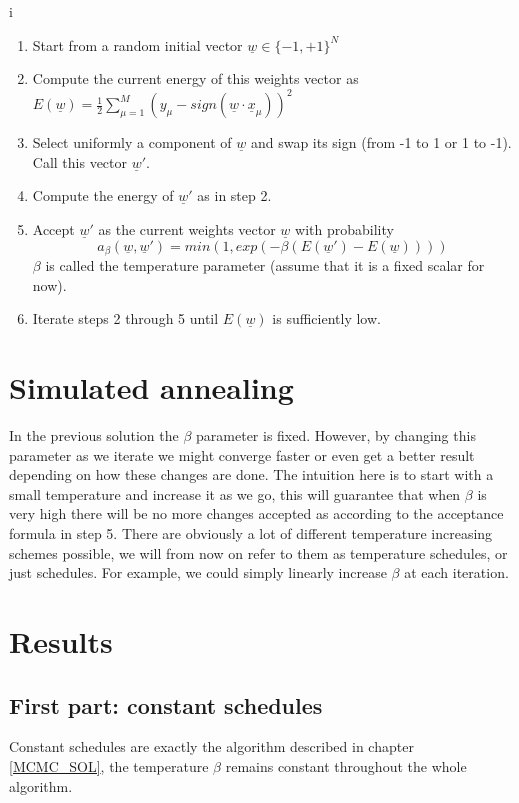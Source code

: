 i\documentclass[a4paper]{article}
\begin{document}
\begin{enumerate}
\item Start from a random initial vector $\underline{w} \in \{-1, +1\}^{N}$
\item Compute the current energy of this weights vector as $E(\underline{w}) = \frac{1}{2} \sum_{\mu = 1}^{M} (y_{\mu} - sign(\underline{w} \cdot \underline{x}_{\mu}))^2$
\item Select uniformly a component of $\underline{w}$ and swap its sign (from -1 to 1 or 1 to -1). Call this vector $\underline{w}'$.
\item Compute the energy of $\underline{w}'$ as in step 2. 
\item Accept $\underline{w}'$ as the current weights vector  $\underline{w}$ with probability \[a_{\beta}(\underline{w}, \underline{w}') = min(1, exp(-\beta(E(\underline{w}') - E(\underline{w}))))\] $\beta$ is called the temperature parameter (assume that it is a fixed scalar for now).
\item Iterate steps 2 through 5 until $E(\underline{w})$ is sufficiently low.
\end{enumerate}

\section{Simulated annealing}

In the previous solution the $\beta$ parameter is fixed. However, by changing this parameter as we iterate we might converge faster or even get a better result depending on how these changes are done. The intuition here is to start with a small temperature and increase it as we go, this will guarantee that when $\beta$ is very high there will be no more changes accepted as according to the acceptance formula in step 5.
There are obviously a lot of different temperature increasing schemes possible, we will from now on refer to them as temperature schedules, or just schedules. For example, we could simply linearly increase $\beta$ at each iteration.

\section{Results}
\subsection{First part: constant schedules}

Constant schedules are exactly the algorithm described in chapter \ref{MCMC_SOL}, the temperature $\beta$ remains constant throughout the whole algorithm.
\end{document}

